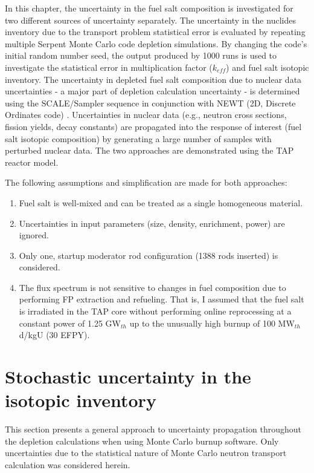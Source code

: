 In this chapter, the uncertainty in the fuel salt composition is investigated 
for two different sources of uncertainty separately. The uncertainty in the 
nuclides inventory due to the transport problem statistical error is evaluated 
by repeating multiple Serpent Monte Carlo code depletion simulations. By 
changing the code's initial random number seed, the output produced by 1000 
runs is used to investigate the statistical error in multiplication factor 
($k_{eff}$) and fuel salt isotopic inventory. The uncertainty in depleted fuel 
salt composition due to nuclear data uncertainties - a major part of depletion 
calculation uncertainty - is determined using the SCALE/Sampler sequence in 
conjunction with NEWT (2D, Discrete Ordinates code) \cite{rearden_scale_2018}. 
Uncertainties in nuclear data (e.g., neutron cross sections, fission yields, 
decay constants) are propagated into the response of interest (fuel salt 
isotopic composition) by generating a large number of samples with perturbed 
nuclear data. The two approaches are demonstrated using the \gls{TAP} reactor 
model.

The following assumptions and simplification are made for both approaches:
\begin{enumerate}[label=(\alph*), noitemsep, topsep=0pt]
	\item Fuel salt is well-mixed and can be treated as a single homogeneous 
	material.
	\item Uncertainties in input parameters (size, density, enrichment, power) 
	are ignored.
	\item Only one, startup moderator rod configuration (1388 rods inserted) 
	is considered.
	\item The flux spectrum is not sensitive to changes in fuel composition 
	due to performing \gls{FP} extraction and refueling. That is, I assumed 
	that the fuel salt is irradiated in the \gls{TAP} core without performing  
	online reprocessing at a constant power of 1.25 GW$_{th}$ up to the 
	unusually high burnup of 100 MW$_{th}$d/kgU (30 \gls{EFPY}).
\end{enumerate}


\section{Stochastic uncertainty in the isotopic inventory} 
\label{sec:uq-stochastic}
This section presents a general approach to uncertainty propagation throughout 
the depletion calculations when using Monte Carlo burnup software. Only 
uncertainties due to the statistical
nature of Monte Carlo neutron transport 
calculation was considered herein. 


